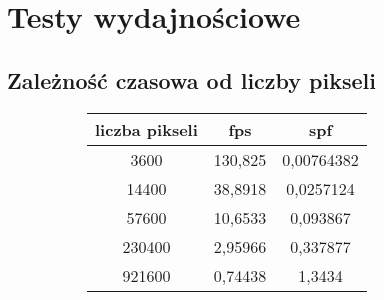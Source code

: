 \section{Testy wydajnościowe}

\subsection{Zależność czasowa od liczby pikseli}


\begin{figure}[!ht]
\advance\leftskip-2cm
\begin{subfigure}{.5\textwidth}
\end{subfigure}
\hspace{2cm}
\begin{subfigure}{.5\textwidth}
		\begin{longtable}{|c|c|c|} \hline
	    liczba pikseli & fps & spf \\ \hline
	    3600 & 130,825 & 0,00764382 \\ 
	    14400 &	38,8918 & 0,0257124 \\
		57600 & 10,6533 & 0,093867 \\
		230400 & 2,95966 & 0,337877 \\
		921600 & 0,74438 & 1,3434 \\
		\hline
		\end{longtable}
\end{subfigure}
\end{figure}


